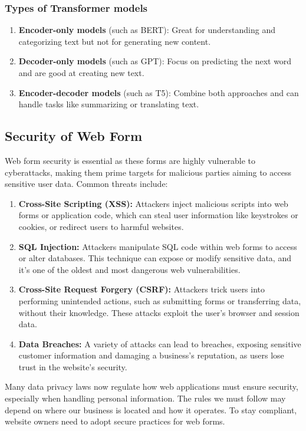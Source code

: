 \documentclass[12pt,oneside,openright,a4paper]{cpe-english-project}
\begin{document}
\subsubsection{Types of Transformer models}
\begin{enumerate}
	\item \textbf{Encoder-only models} (such as BERT): Great for understanding and categorizing text but not for generating new content.
	\item \textbf{Decoder-only models} (such as GPT): Focus on predicting the next word and are good at creating new text.
	\item \textbf{Encoder-decoder models} (such as T5): Combine both approaches and can handle tasks like summarizing or translating text.
\end{enumerate}

\subsection{Security of Web Form} Web form security is essential as these forms are highly vulnerable to cyberattacks, making them prime targets for malicious parties aiming to access sensitive user data. 
Common threats include:
\begin{enumerate}
	\item \textbf{Cross-Site Scripting (XSS):} Attackers inject malicious scripts into web forms or application code, which can steal user information like keystrokes or cookies, or redirect users to harmful websites.
	\item \textbf{SQL Injection:} Attackers manipulate SQL code within web forms to access or alter databases. This technique can expose or modify sensitive data, and it’s one of the oldest and most dangerous web vulnerabilities.
	\item \textbf{Cross-Site Request Forgery (CSRF):} Attackers trick users into performing unintended actions, such as submitting forms or transferring data, without their knowledge. These attacks exploit the user’s browser and session data.
	\item \textbf{Data Breaches:} A variety of attacks can lead to breaches, exposing sensitive customer information and damaging a business's reputation, as users lose trust in the website's security.
\end{enumerate}

	Many data privacy laws now regulate how web applications must ensure security, especially when handling personal information. The rules we must follow may depend on where our business is located and how it operates. To stay compliant, website owners need to adopt secure practices for web forms.
\end{document}
